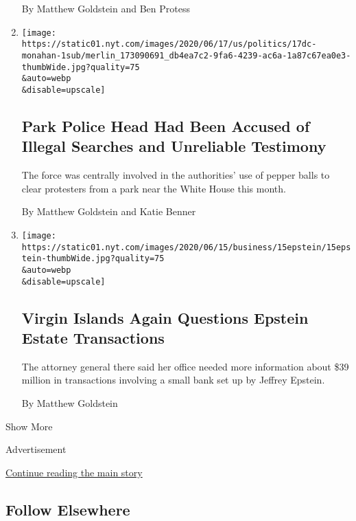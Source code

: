 \begin{enumerate}
  By Matthew Goldstein and Ben Protess
\item
  \href{/2020/06/18/us/politics/park-police-gregory-monahan.html}{}

  \texttt{[image: https://static01.nyt.com/images/2020/06/17/us/politics/17dc-monahan-1sub/merlin\_173090691\_db4ea7c2-9fa6-4239-ac6a-1a87c67ea0e3-thumbWide.jpg?quality=75\\\&auto=webp\\\&disable=upscale]}

  \hypertarget{park-police-head-had-been-accused-of-illegal-searches-and-unreliable-testimony}{%
  \subsection{Park Police Head Had Been Accused of Illegal Searches and
  Unreliable
  Testimony}\label{park-police-head-had-been-accused-of-illegal-searches-and-unreliable-testimony}}

  The force was centrally involved in the authorities' use of pepper
  balls to clear protesters from a park near the White House this month.

  By Matthew Goldstein and Katie Benner
\item
  \href{/2020/06/15/business/virgin-islands-jeffrey-epstein-bank.html}{}

  \texttt{[image: https://static01.nyt.com/images/2020/06/15/business/15epstein/15epstein-thumbWide.jpg?quality=75\\\&auto=webp\\\&disable=upscale]}

  \hypertarget{virgin-islands-again-questions-epstein-estate-transactions}{%
  \subsection{Virgin Islands Again Questions Epstein Estate
  Transactions}\label{virgin-islands-again-questions-epstein-estate-transactions}}

  The attorney general there said her office needed more information
  about \$39 million in transactions involving a small bank set up by
  Jeffrey Epstein.

  By Matthew Goldstein
\end{enumerate}

Show More

Advertisement

\protect\hyperlink{after-mid2}{Continue reading the main story}

\hypertarget{follow-elsewhere}{%
\subsection{Follow Elsewhere}\label{follow-elsewhere}}

